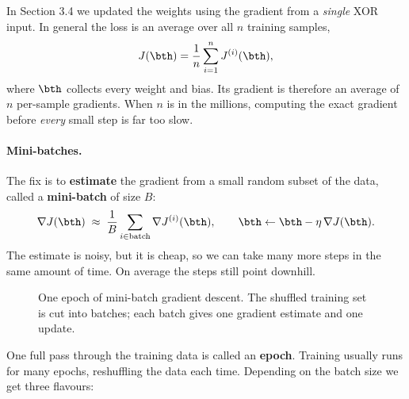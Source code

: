 \documentclass[12pt, a4paper]{article}
\begin{document}
In Section 3.4 we updated the weights using the gradient from a
\emph{single} XOR input. In general the loss is an average over all $n$
training samples,
\[
  J(\bth) = \frac{1}{n} \sum_{i=1}^{n} J^{(i)}(\bth),
\]
where $\bth$ collects every weight and bias. Its gradient is therefore an
average of $n$ per-sample gradients. When $n$ is in the millions, computing
the exact gradient before \emph{every} small step is far too slow.

\paragraph{Mini-batches.}
The fix is to \textbf{estimate} the gradient from a small random subset of
the data, called a \textbf{mini-batch} of size $B$:
\[
  \nabla J(\bth) \;\approx\; \frac{1}{B} \sum_{i \in \text{batch}}
  \nabla J^{(i)}(\bth),
  \qquad
  \bth \leftarrow \bth - \eta\, \nabla J(\bth).
\]
The estimate is noisy, but it is cheap, so we can take many more steps in the
same amount of time. On average the steps still point downhill.

\begin{figure}[H]
  \centering
  \caption{One epoch of mini-batch gradient descent. The shuffled training set
    is cut into batches; each batch gives one gradient estimate and one
    update.}
\end{figure}

One full pass through the training data is called an \textbf{epoch}.
Training usually runs for many epochs, reshuffling the data each time.
Depending on the batch size we get three flavours:
\end{document}
